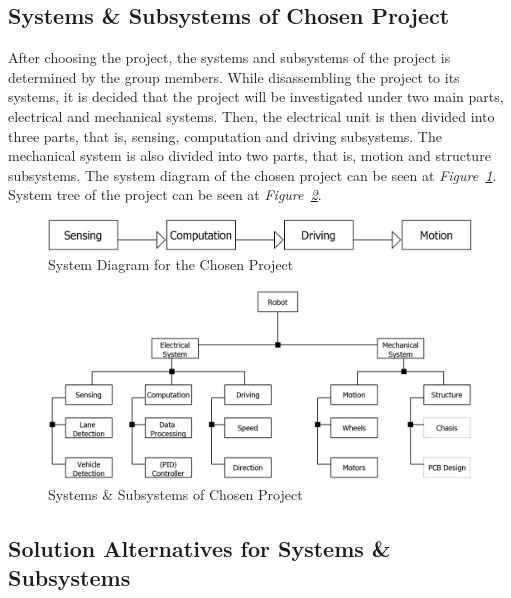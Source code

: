 \documentclass[a4paper,12pt]{article}
\begin{document}
	
	
	\subsection{Systems \& Subsystems of Chosen Project}
		
	After choosing the project, the systems and subsystems of the project is determined by the group members. While disassembling the project to its systems, it is decided that the project will be investigated under two main parts, electrical and mechanical systems. Then, the electrical unit is then divided into three parts, that is, sensing, computation and driving subsystems. The mechanical system is also divided into two parts, that is, motion and structure subsystems. The system diagram of the chosen project can be seen at \textit{Figure~\ref{fig:system_diagram}}. System tree of the project can be seen at \textit{Figure~\ref{fig:systems_project}}.
	
	\begin{figure}[H]
		\centering
		\includegraphics[width=\textwidth,height=\textheight,keepaspectratio]{product-tree/system-flow} 
		\caption{\label{fig:system_diagram}System Diagram for the Chosen Project}
	\end{figure}
	
	
	\begin{figure}[H]
		\centering
		\includegraphics[width=\textwidth,height=\textheight,keepaspectratio]{product-tree/product-tree} 
		\caption{\label{fig:systems_project}Systems \& Subsystems of Chosen Project}
	\end{figure}

	\subsection{Solution Alternatives for Systems \& Subsystems }
	
\end{document}
